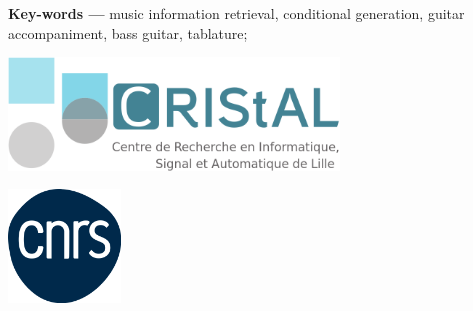 \begin{titlepage}
\begin{flushleft}
\textbf{Key-words ---} music information retrieval, conditional generation, guitar accompaniment, bass guitar, tablature;
\vspace{.5\baselineskip}\\
\end{flushleft}
\vfill

\begin{minipage}{.25\linewidth}
\includegraphics[height=3cm]{../images-figures/logoCRIStAL.png}
\end{minipage}
\hspace{7cm}
\begin{minipage}{.25\linewidth}
\includegraphics[height=3cm]{../images-figures/cnrs.png}
\end{minipage}

\end{titlepage}
